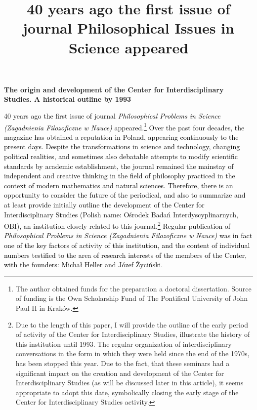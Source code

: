 \documentclass[a4paper]{article}
\title{40 years ago the first issue of journal {\textquotedbl}Philosophical Issues in Science{\textquotedbl} appeared}
\begin{document}
{\bfseries
The origin and development of the Center for Interdisciplinary Studies. A historical outline by 1993}

\textcolor{black}{40 years ago the first issue of journal }\textit{\textcolor{black}{Philosophical Problems in Science
(Zagadnienia Filozoficzne w Nauce)}}\textcolor{black}{ appeared.}\footnote{ The author obtained funds for the
preparation a doctoral dissertation. Source of funding is the Own Scholarship Fund of The Pontifical University of John
Paul II in Kraków.}\textcolor{black}{ Over the past four decades, the magazine has obtained a reputation in Poland,
appearing continuously to the present days. Despite the transformations in science and technology, changing political
realities, and sometimes also debatable attempts to modify scientific standards by academic establishment, the journal
remained the mainstay of independent and creative thinking in the field of philosophy practiced in the context of
modern mathematics and natural sciences. Therefore, there is an opportunity to consider the future of the periodical,
and also to summarize and at least provide initially outline the development of the Center for Interdisciplinary
Studies (Polish name: Ośrodek Badań Interdyscyplinarnych, OBI), an institution closely related to this
journal.}\footnote{ Due to the length of this paper, I will provide the outline of the early period of activity of the
Center for Interdisciplinary Studies, illustrate the history of this institution until 1993. The regular organization
of interdisciplinary conversations in the form in which they were held since the end of the 1970s, has been stopped
this year. Due to the fact, that these seminars had a significant impact on the creation and development of the Center
for Interdisciplinary Studies (as will be discussed later in this article), it seems appropriate to adopt this date,
symbolically closing the early stage of the Center for Interdisciplinary Studies activity.}\textcolor{black}{ Regular
publication of }\textit{\textcolor{black}{Philosophical Problems in Science (Zagadnienia Filozoficzne w
Nauce)}}\textcolor{black}{ was in fact one of the key factors of activity of this institution, and the content of
individual numbers testified to the area of research interests of the members of the Center, with the founders: Michał
Heller and Józef Życiński.}
\end{document}

